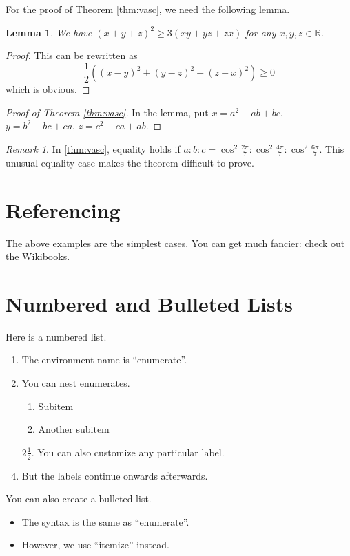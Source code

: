 \documentclass[11pt]{scrartcl}
\theoremstyle{plain} %
\newtheorem{lemma}[theorem]{Lemma}
\theoremstyle{definition}
\theoremstyle{remark}
\newtheorem{remark}{Remark}
\newcommand{\half}{\frac{1}{2}}
\begin{document}
For the proof of Theorem \ref{thm:vasc}, we need the following lemma.

\begin{lemma}
  We have $\left( x+y+z \right)^2 \ge 3(xy+yz+zx)$ for any $x,y,z \in \mathbb R$.
\end{lemma}
\begin{proof}
  This can be rewritten as
  \[ \half\left( (x-y)^2+(y-z)^2+(z-x)^2 \right) \ge 0 \]
  which is obvious.
\end{proof}

\begin{proof}
  [Proof of Theorem \ref{thm:vasc}]
  In the lemma, put $x=a^2-ab+bc$, $y=b^2-bc+ca$, $z=c^2-ca+ab$.
\end{proof}

\begin{remark}
  In \autoref{thm:vasc}, equality holds if
  $a : b : c = \cos^2 \frac{2\pi}{7} : \cos^2 \frac{4\pi}{7} : \cos^2 \frac{6\pi}{7}$.
  This unusual equality case makes the theorem difficult to prove.
\end{remark}

\section{Referencing}
The above examples are the simplest cases.
You can get much fancier: check out
\href{http://en.wikibooks.org/wiki/LaTeX/Labels_and_Cross-referencing}{the Wikibooks}.

\section{Numbered and Bulleted Lists}
Here is a numbered list.
\begin{enumerate}
  \item The environment name is ``enumerate''.
  \item You can nest enumerates.
    \begin{enumerate}
      \item Subitem
      \item Another subitem
    \end{enumerate}
  \item[$2 \half$.] You can also customize any particular label.
  \item But the labels continue onwards afterwards.
\end{enumerate}

\bigskip

You can also create a bulleted list.
\begin{itemize}
  \item The syntax is the same as ``enumerate''.
  \item However, we use ``itemize'' instead.
\end{itemize}
\end{document}
